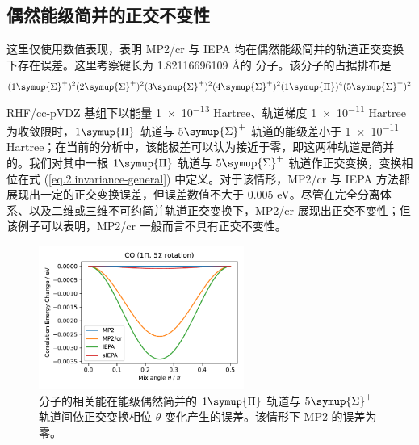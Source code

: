 \subsection{偶然能级简并的正交不变性}

这里仅使用数值表现，表明 MP2/cr 与 IEPA 均在偶然能级简并的轨道正交变换下存在误差。这里考察键长为 1.82116696109 \AA 的  分子。该分子的占据排布是
$$
(1 \symup{\Sigma}^+)^2 (2 \symup{\Sigma}^+)^2 (3 \symup{\Sigma}^+)^2 (4 \symup{\Sigma}^+)^2 (1 \symup{\Pi})^4 (5 \symup{\Sigma}^+)^2
$$
RHF/cc-pVDZ 基组下以能量 \num{1e-13} Hartree、轨道梯度 \num{1e-11} Hartree 为收敛限时，$1 \symup{\Pi}$ 轨道与 $5 \symup{\Sigma}^+$ 轨道的能级差小于 \num{1e-11} Hartree；在当前的分析中，该能极差可以认为接近于零，即这两种轨道是简并的。我们对其中一根 $1 \symup{\Pi}$ 轨道与 $5 \symup{\Sigma}^+$ 轨道作正交变换，变换相位在式 (\ref{eq.2.invariance-general}) 中定义。对于该情形，MP2/cr 与 IEPA 方法都展现出一定的正交变换误差，但误差数值不大于 0.005 eV。尽管在完全分离体系、以及二维或三维不可约简并轨道正交变换下，MP2/cr 展现出正交不变性；但该例子可以表明，MP2/cr 一般而言不具有正交不变性。

\begin{figure}[!ht]
  \centering
  \includegraphics[width=0.6\textwidth]{assets/invar-sep-CO.pdf}
  \caption{ 分子的相关能在能级偶然简并的 $1 \symup{\Pi}$ 轨道与 $5 \symup{\Sigma}^+$ 轨道间依正交变换相位 $\theta$ 变化产生的误差。该情形下 MP2 的误差为零。}
  \label{fig.2.invar-sep-CO}
\end{figure}
